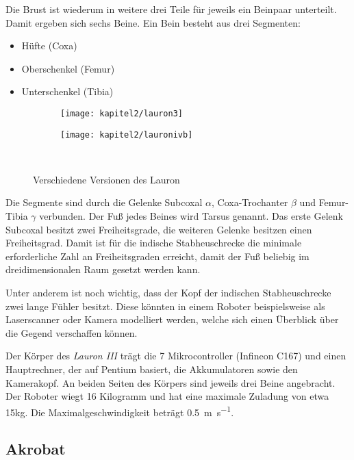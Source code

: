 Die Brust ist wiederum in weitere drei Teile für jeweils ein Beinpaar unterteilt. Damit ergeben sich sechs Beine. Ein Bein besteht aus drei Segmenten:
\begin{itemize}
  \item Hüfte (Coxa)
  \item Oberschenkel (Femur)
  \item Unterschenkel (Tibia)
\end{itemize}

\begin{figure}[b!]
  \centering
  \begin{subfigure}[b]{.4\linewidth}
    \centering
    \texttt{[image: kapitel2/lauron3]}
    \label{kap2:lauron3}
  \end{subfigure}%
  \qquad
  \begin{subfigure}[b]{.4\linewidth}
    \centering
    \texttt{[image: kapitel2/lauronivb]}
    \label{kap2:lauron4b}
  \end{subfigure}\\
  \caption{Verschiedene Versionen des Lauron}
  \label{kap2lauron}
\end{figure}

Die Segmente sind durch die Gelenke Subcoxal $\alpha$, Coxa-Trochanter $\beta$ und Femur-Tibia $\gamma$ verbunden. Der Fuß jedes Beines wird Tarsus genannt. Das erste Gelenk Subcoxal besitzt zwei Freiheitsgrade, die weiteren Gelenke besitzen einen Freiheitsgrad. Damit ist für die indische Stabheuschrecke die minimale erforderliche Zahl an Freiheitsgraden erreicht, damit der Fuß beliebig im dreidimensionalen Raum gesetzt werden kann.

Unter anderem ist noch wichtig, dass der Kopf der indischen Stabheuschrecke zwei lange Fühler besitzt. Diese könnten in einem Roboter beispielsweise als Laserscanner oder Kamera modelliert werden, welche sich einen Überblick über die Gegend verschaffen können.

Der Körper des \emph{Lauron III} trägt die 7 Mikrocontroller (Infineon C167) und einen Hauptrechner, der auf Pentium basiert, die Akkumulatoren sowie den Kamerakopf. An beiden Seiten des Körpers sind jeweils drei Beine angebracht. Der Roboter wiegt 16 Kilogramm und hat eine maximale Zuladung von etwa 15kg. Die Maximalgeschwindigkeit beträgt \SI{0.5}{\metre\per\second}. \autocite{gassmann2000} \autocite{troilo2007}

\subsection{Akrobat}

